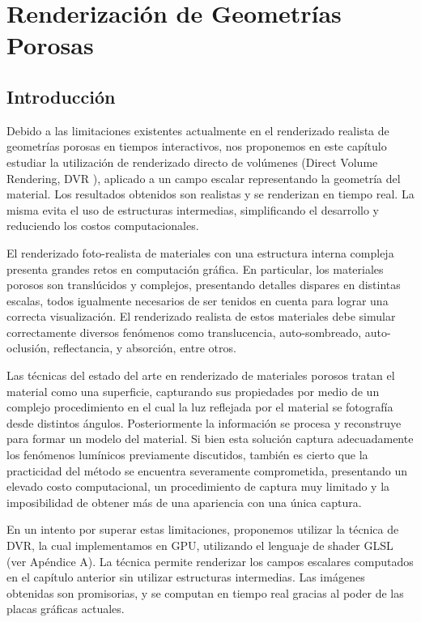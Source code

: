 
\chapter{Renderización de Geometrías Porosas}
\section{Introducción}
Debido a las limitaciones existentes actualmente en el renderizado realista de geometrías porosas en tiempos interactivos, nos proponemos en este capítulo estudiar la utilización de renderizado directo de volúmenes (Direct Volume Rendering, \acrshort{DVR} \cite{Kratz2006}), aplicado a un campo escalar representando la geometría del material. 
Los resultados obtenidos son realistas y se renderizan en tiempo real. La misma evita el uso de estructuras intermedias, simplificando el desarrollo y reduciendo los costos computacionales.

El renderizado foto-realista de materiales con una estructura interna compleja presenta grandes retos en computación gráfica.
En particular, los materiales porosos son translúcidos y complejos, presentando detalles dispares en distintas escalas, todos igualmente necesarios de ser tenidos en cuenta para lograr una correcta visualización.
El renderizado realista de estos materiales debe simular correctamente diversos fenómenos como translucencia, auto-sombreado, auto-oclusión, reflectancia, y absorción, entre otros.

Las técnicas del estado del arte en renderizado de materiales porosos tratan el material como una superficie, capturando sus propiedades por medio de un complejo procedimiento en el cual la luz reflejada por el material se fotografía desde distintos ángulos.
Posteriormente la información se procesa y reconstruye para formar un modelo del material.
Si bien esta solución captura adecuadamente los fenómenos lumínicos previamente discutidos, también es cierto que la practicidad del método se encuentra severamente comprometida, presentando un elevado costo computacional, un procedimiento de captura muy limitado y la imposibilidad de obtener más de una apariencia con una única captura.

En un intento por superar estas limitaciones, proponemos utilizar la técnica de DVR, la cual implementamos en \acrshort{GPU}, utilizando el lenguaje de shader GLSL (ver Apéndice A).
La técnica permite renderizar los campos escalares computados en el capítulo anterior sin utilizar estructuras intermedias.
Las imágenes obtenidas son promisorias, y se computan en tiempo real gracias al poder de las placas gráficas actuales.

